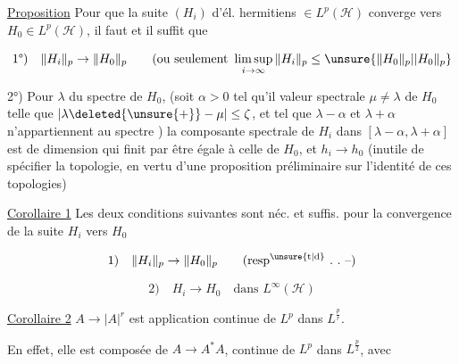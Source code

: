 \uline{Proposition} Pour que la suite $(H_i)$ d'él. hermitiens $\in L^p(\mathscr H)$ converge vers $H_0\in L^p(\mathscr H)$, il faut et il suffit que

\[
\text{1°)}\quad\|H_i\|_p\to\|H_0\|_p\qquad
\text{(ou seulement }\limsup_{i\to\infty}\|H_i\|_p\leq\unsure{\|H_0\|_p|\lvert H_0\|_p}
\]

2°) Pour  $\lambda$ du spectre de $H_0$, (soit $\alpha>0$ tel qu'il  valeur spectrale $\mu\neq\lambda$ de $H_0$ telle que $|\lambda\deleted{\unsure{+}}-\mu|\leq\zeta$,   et tel que $\lambda-\alpha$ et $\lambda+\alpha$ n'appartiennent au spectre )  la composante spectrale de $H_i$  dans $[\lambda-\alpha,\lambda+\alpha]$ est de dimension  qui finit par être égale à celle de $H_0$, et $h_i\to h_0$ (inutile de spécifier la topologie, en vertu d'une proposition préliminaire sur l'identité de  ces topologies)


\uline{Corollaire 1} Les deux conditions suivantes sont néc. et suffis.  pour la convergence de la suite $H_i$ vers $H_0$

\[
\text{1)}\quad\|H_i\|_p\to\|H_0\|_p\qquad\text{(resp$^{\unsure{\mathrm t|\mathrm d}}$ .\ .\ --)}
\]

\[
\text{2)}\quad H_i\to H_0\quad\text{dans }L^\infty(\mathscr H)
\]

\uline{Corollaire 2} $A\to |A|^r$ est application continue de $L^p$ dans $L^{\frac pr}$.

En effet, elle est composée de $A\to A^*A$, continue de $L^p$ dans $L^{\frac p2}$, avec
